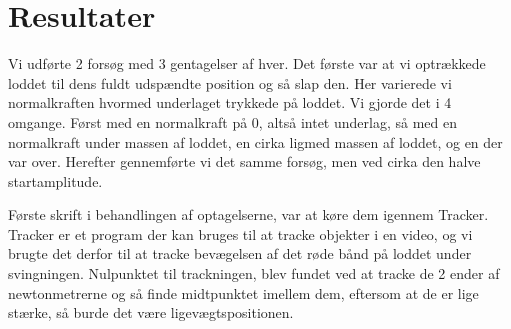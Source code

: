 \chapter{Resultater}
Vi udførte 2 forsøg med 3 gentagelser af hver. Det første var at vi optrækkede loddet til dens fuldt udspændte position og så slap den. 
Her varierede vi normalkraften hvormed underlaget trykkede på loddet. Vi gjorde det i 4 omgange. Først med en normalkraft på 0, altså intet underlag, så med en normalkraft under massen af loddet, en cirka ligmed massen af loddet, og en der var over.
Herefter gennemførte vi det samme forsøg, men ved cirka den halve startamplitude.

Første skrift i behandlingen af optagelserne, var at køre dem igennem Tracker. 
Tracker er et program der kan bruges til at tracke objekter i en video, 
og vi brugte det derfor til at tracke bevægelsen af det røde bånd på loddet under svingningen.
Nulpunktet til trackningen, blev fundet ved at tracke de 2 ender af newtonmetrerne og så finde midtpunktet imellem dem, eftersom at de er lige stærke, så burde det være ligevægtspositionen.

